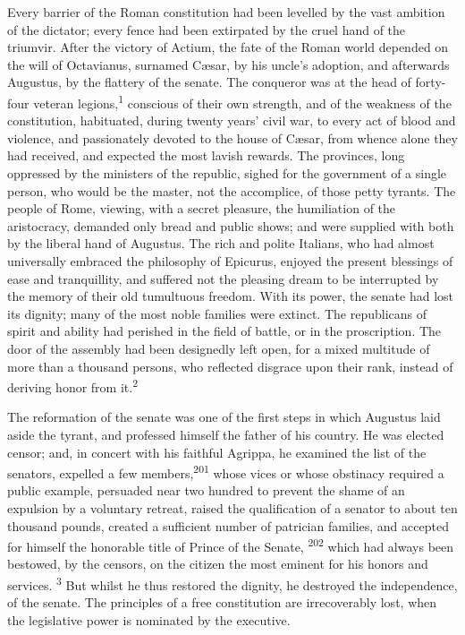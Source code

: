 Every barrier of the Roman constitution had been levelled by the
vast ambition of the dictator; every fence had been extirpated by
the cruel hand of the triumvir. After the victory of Actium, the
fate of the Roman world depended on the will of Octavianus,
surnamed Cæsar, by his uncle’s adoption, and afterwards Augustus,
by the flattery of the senate. The conqueror was at the head of
forty-four veteran legions,\textsuperscript{1} conscious of their own strength,
and of the weakness of the constitution, habituated, during
twenty years’ civil war, to every act of blood and violence, and
passionately devoted to the house of Cæsar, from whence alone
they had received, and expected the most lavish rewards. The
provinces, long oppressed by the ministers of the republic,
sighed for the government of a single person, who would be the
master, not the accomplice, of those petty tyrants. The people of
Rome, viewing, with a secret pleasure, the humiliation of the
aristocracy, demanded only bread and public shows; and were
supplied with both by the liberal hand of Augustus. The rich and
polite Italians, who had almost universally embraced the
philosophy of Epicurus, enjoyed the present blessings of ease and
tranquillity, and suffered not the pleasing dream to be
interrupted by the memory of their old tumultuous freedom. With
its power, the senate had lost its dignity; many of the most
noble families were extinct. The republicans of spirit and
ability had perished in the field of battle, or in the
proscription. The door of the assembly had been designedly left
open, for a mixed multitude of more than a thousand persons, who
reflected disgrace upon their rank, instead of deriving honor
from it.\textsuperscript{2}



The reformation of the senate was one of the first steps in which
Augustus laid aside the tyrant, and professed himself the father
of his country. He was elected censor; and, in concert with his
faithful Agrippa, he examined the list of the senators, expelled
a few members,\textsuperscript{201} whose vices or whose obstinacy required a
public example, persuaded near two hundred to prevent the shame
of an expulsion by a voluntary retreat, raised the qualification
of a senator to about ten thousand pounds, created a sufficient
number of patrician families, and accepted for himself the
honorable title of Prince of the Senate, \textsuperscript{202} which had always
been bestowed, by the censors, on the citizen the most eminent
for his honors and services. \textsuperscript{3} But whilst he thus restored the
dignity, he destroyed the independence, of the senate. The
principles of a free constitution are irrecoverably lost, when
the legislative power is nominated by the executive.

